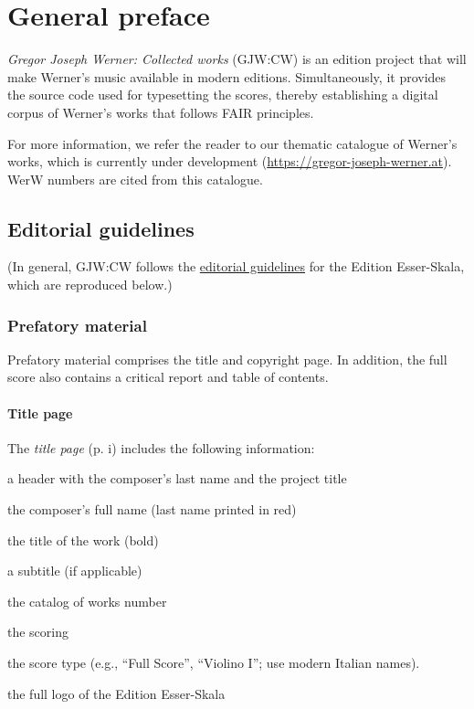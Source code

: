 \documentclass{ees}
\begin{document}

\setcounter{page}{1}

\tableofcontents

\chapter{General preface}

\textit{Gregor Joseph Werner: Collected works} (GJW:CW) is an edition project that will make Werner’s music available in modern editions. Simultaneously, it provides the source code used for typesetting the scores, thereby establishing a digital corpus of Werner’s works that follows FAIR principles.

For more information, we refer the reader to our thematic catalogue of Werner’s works, which is currently under development (\href{https://gregor-joseph-werner.at}{https://gregor-joseph-werner.at}). WerW numbers are cited from this catalogue.


\section{Editorial guidelines}

(In general, GJW:CW follows the \href{https://edition.esser-skala.at/about/editorial-guidelines/}{editorial guidelines} for the Edition Esser-Skala, which are reproduced below.)


\subsection{Prefatory material}

Prefatory material comprises the title and copyright page. In addition, the full score also contains a critical report and table of contents.


\subsubsection{Title page}

The \textit{title page} (p. i) includes the following information:
\begin{bulletlist}
  \item a header with the composer's last name and the project title
  \item the composer's full name (last name printed in red)
  \item the title of the work (bold)
  \item a subtitle (if applicable)
  \item the catalog of works number
  \item the scoring
  \item the score type (e.g., “Full Score”, “Violino I”; use modern Italian names).
  \item the full logo of the Edition Esser-Skala
\end{bulletlist}
\end{document}
